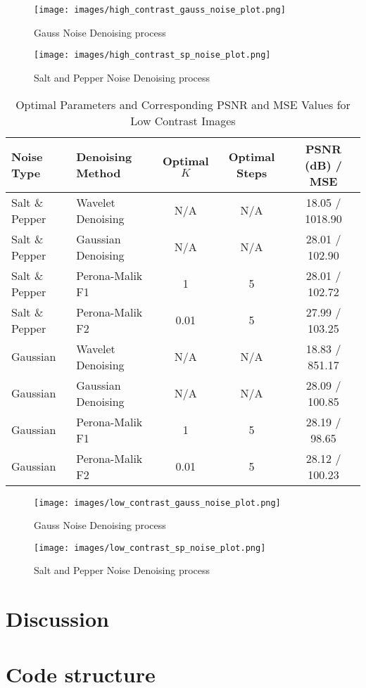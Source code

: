 \documentclass{article}
\begin{document}
\begin{figure}[H]
    \centering
    \texttt{[image: images/high\_contrast\_gauss\_noise\_plot.png]}
    \caption{Gauss Noise Denoising process}
    \label{fig:denoising_3}
\end{figure}

\begin{figure}[H]
    \centering
    \texttt{[image: images/high\_contrast\_sp\_noise\_plot.png]}
    \caption{Salt and Pepper Noise Denoising process}
    \label{fig:denoising_4}
\end{figure}

\begin{table}[H]
\centering
\caption{Optimal Parameters and Corresponding PSNR and MSE Values for Low Contrast Images}
\label{tab:optimal_low_contrast_parameters}
\begin{tabular}{llccc}
\hline
Noise Type & Denoising Method & Optimal \( K \) & Optimal Steps & PSNR (dB) / MSE \\ \hline
Salt \& Pepper & Wavelet Denoising & N/A & N/A & 18.05 / 1018.90 \\
Salt \& Pepper & Gaussian Denoising & N/A & N/A & 28.01 / 102.90 \\
Salt \& Pepper & Perona-Malik F1 & 1 & 5 & 28.01 / 102.72 \\
Salt \& Pepper & Perona-Malik F2 & 0.01 & 5 & 27.99 / 103.25 \\
Gaussian & Wavelet Denoising & N/A & N/A & 18.83 / 851.17 \\
Gaussian & Gaussian Denoising & N/A & N/A & 28.09 / 100.85 \\
Gaussian & Perona-Malik F1 & 1 & 5 & 28.19 / 98.65 \\
Gaussian & Perona-Malik F2 & 0.01 & 5 & 28.12 / 100.23 \\ \hline
\end{tabular}
\end{table}


\begin{figure}[H]
    \centering
    \texttt{[image: images/low\_contrast\_gauss\_noise\_plot.png]}
    \caption{Gauss Noise Denoising process}
    \label{fig:denoising_5}
\end{figure}

\begin{figure}[H]
    \centering
    \texttt{[image: images/low\_contrast\_sp\_noise\_plot.png]}
    \caption{Salt and Pepper Noise Denoising process}
    \label{fig:denoising_6}
\end{figure}



\section{Discussion}
\section{Code structure}
\end{document}
